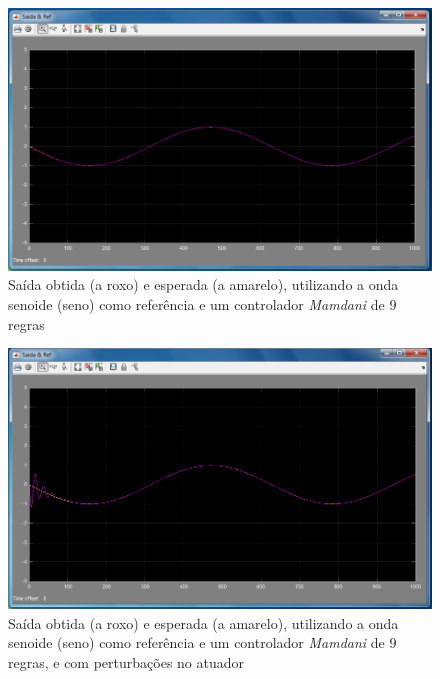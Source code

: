 \documentclass{article}
\begin{document}
\begin{figure}[h]
  \centering
      \includegraphics[scale=0.3]{Images/Mamdani_9_sin.png}
  \caption{Saída obtida (a roxo) e esperada (a amarelo), utilizando a onda senoide (seno) como referência e um controlador \emph{Mamdani} de $9$ regras}
\end{figure}

\begin{figure}[h]
  \centering
      \includegraphics[scale=0.3]{Images/Mamdani_9_sin_actuator.png}
  \caption{Saída obtida (a roxo) e esperada (a amarelo), utilizando a onda senoide (seno) como referência e um controlador \emph{Mamdani} de $9$ regras, e com perturbações no atuador}
\end{figure}
\end{document}
